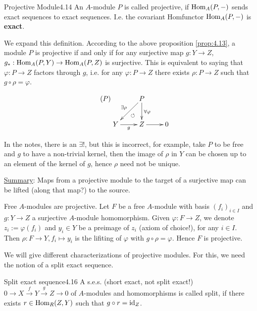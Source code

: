 \documentclass[twoside = false,	%
		headsepline,		%
		parskip = true,
		]{scrbook}						%
\begin{document}
    \begin{definition}{Projective Module}{4.14}
        An $A$-module $P$ is called projective, if $\mathrm{Hom}_A(P,-)$ sends exact sequences to exact sequences. I.e. the covariant Homfunctor $\mathrm{Hom}_A(P,-)$ is \textbf{exact}.
    \end{definition}

    We expand this definition. According to the above proposition \ref{prop:4.13}, a module $P$ is projective if and only if for any surjective map $g: Y \to Z$, $g_*: \mathrm{Hom}_A(P,Y) \to \mathrm{Hom}_A(P,Z)$ is surjective. This is equivalent to saying that $\varphi: P \to Z$ factors through $g$, i.e. for any $\varphi: P \to Z$ there exists $\rho:P \to Z$ such that $g \circ \rho = \varphi$.

    \begin{equation}\tag{$P$}\label{proj}
    \xymatrix {
        & P \ar[d]^{\forall \varphi} \ar[dl]_{\exists \rho}^{\circlearrowleft} \\
        Y \ar[r]_g & Z \ar[r] & 0
    }
    \end{equation}

    In the notes, there is an $\exists!$, but this is incorrect, for example, take $P$ to be free and $g$ to have a non-trivial kernel, then the image of $\rho$ in $Y$ can be chosen up to an element of the kernel of $g$, hence $\rho$ need not be unique.

    \underline{Summary}: Maps from a projective module to the target of a surjective map can be lifted (along that map?) to the source.

    \begin{example}{}{}
        Free $A$-modules are projective. Let $F$ be a free $A$-module with basis $(f_i)_{i \in I}$ and $g: Y \to Z$ a surjective $A$-module homomorphism. Given $\varphi: F \to Z$, we denote $z_i:= \varphi(f_i)$ and $y_i \in Y$ be a preimage of $z_i$ (axiom of choice!), for any $i \in I$. Then $\rho: F \to Y, f_i \mapsto y_i$ is the lifiting of $\varphi$ with $g \circ \rho = \varphi$. Hence $F$ is projective.
    \end{example}

    We will give different characterizations of projective modules. For this, we need the notion of a split exact sequence.

    \begin{definition}{Split exact sequence}{4.16}
        A s.e.s. (short exact, not split exact!) $0 \to X \xrightarrow{f} Y \xrightarrow{g} Z \to 0$ of $A$-modules and homomorphisms is called split, if there exists $r \in \mathrm{Hom}_R(Z,Y)$ such that $g \circ r = \mathrm{id}_Z$.
    \end{definition}
\end{document}

